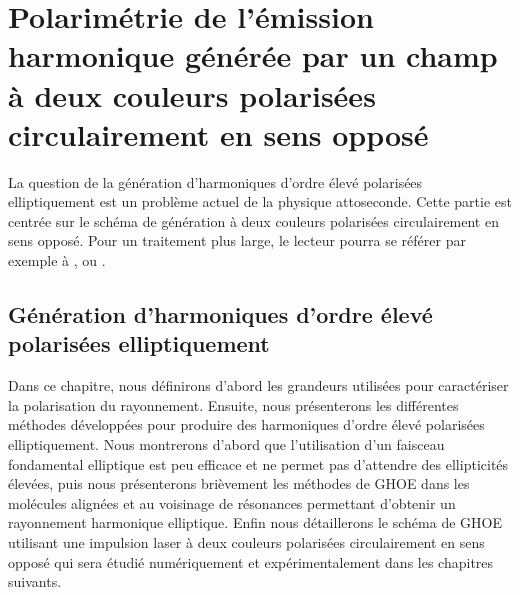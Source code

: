 \part{Polarimétrie de l'émission harmonique générée par un champ à deux couleurs polarisées circulairement en sens opposé}
\label{part:Polarimétrie}



La question de la génération d'harmoniques d'ordre élevé polarisées elliptiquement est un problème actuel de la physique attoseconde. Cette partie est centrée sur le schéma de génération à deux couleurs polarisées circulairement en sens opposé. Pour un traitement plus large, le lecteur pourra se référer par exemple à ,  ou .

\chapter{Génération d'harmoniques d'ordre élevé polarisées elliptiquement}
\label{chap:GHOE_elliptiques}
Dans ce chapitre, nous définirons d'abord les grandeurs utilisées pour caractériser la polarisation du rayonnement. Ensuite, nous présenterons les différentes méthodes développées pour produire des harmoniques d'ordre élevé polarisées elliptiquement. Nous montrerons d'abord que l'utilisation d'un faisceau fondamental elliptique est peu efficace et ne permet pas d'attendre des ellipticités élevées, puis nous présenterons brièvement les méthodes de GHOE dans les molécules alignées et au voisinage de résonances permettant d'obtenir un rayonnement harmonique elliptique. Enfin nous détaillerons le schéma de GHOE utilisant une impulsion laser à deux couleurs polarisées circulairement en sens opposé qui sera étudié numériquement et expérimentalement dans les chapitres suivants. 

